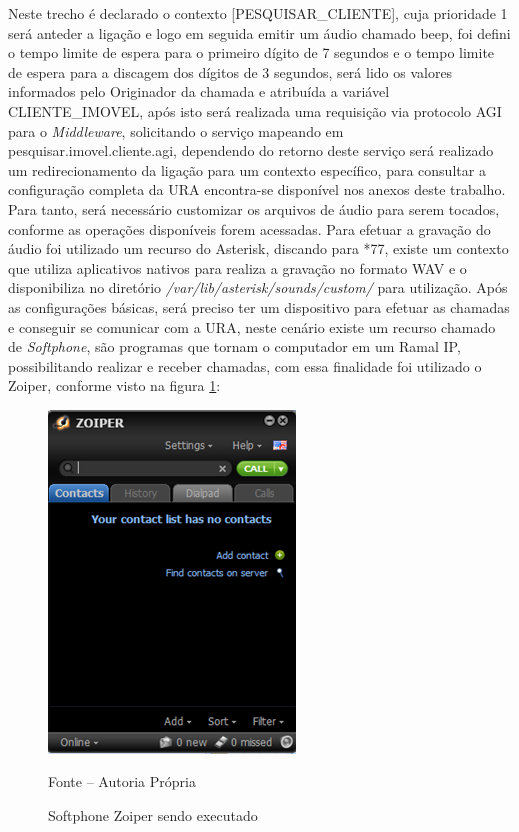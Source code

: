 Neste trecho é declarado o contexto [PESQUISAR\_CLIENTE], cuja prioridade 1 será anteder a ligação e logo em seguida emitir um áudio chamado beep, foi defini o tempo limite de espera para o primeiro dígito de 7 segundos e o tempo limite de espera para a discagem dos dígitos de 3 segundos, será lido os valores informados pelo Originador da chamada e atribuída a variável CLIENTE\_IMOVEL, após isto será realizada uma requisição via protocolo AGI para o \textit{Middleware}, solicitando o serviço mapeando em pesquisar.imovel.cliente.agi, dependendo do retorno deste serviço será realizado um redirecionamento da ligação para um contexto específico, para consultar a configuração completa da URA encontra-se disponível nos anexos deste trabalho.
Para tanto, será necessário customizar os arquivos de áudio para serem tocados, conforme as operações disponíveis forem acessadas. Para efetuar a gravação do áudio foi utilizado um recurso do Asterisk, discando para *77, existe um contexto que utiliza aplicativos nativos para realiza a gravação no formato WAV e o disponibiliza no diretório \textit{/var/lib/asterisk/sounds/custom/} para utilização.
Após as configurações básicas, será preciso ter um dispositivo para efetuar as chamadas e conseguir se comunicar com a URA, neste cenário existe um recurso chamado de \textit{Softphone}, são programas que tornam o computador em um Ramal IP, possibilitando realizar e receber chamadas, com essa finalidade foi utilizado o Zoiper, conforme visto na figura \ref{figura:zoiper}:

\begin{figure}[!htb]
	\centering
	\includegraphics{figuras/zoiper.png}
	\caption{Softphone Zoiper sendo executado}	
	\label{figura:zoiper}
	Fonte – Autoria Própria
\end{figure}


